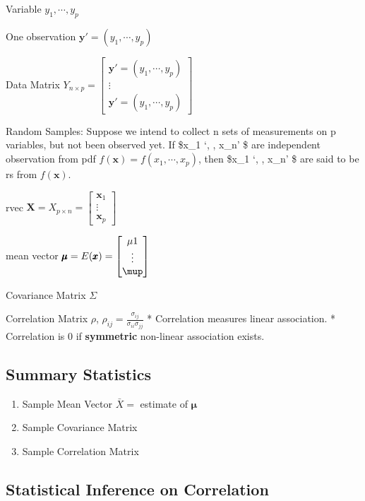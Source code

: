 \documentclass[
]{book}
\providecommand{\tightlist}{%
  \setlength{\itemsep}{0pt}\setlength{\parskip}{0pt}}
\begin{document}
Variable \(y_1 , \cdots, y_p\)

One observation \(\pmb y ' = (y_1 , \cdots, y_p )\)

Data Matrix \(Y_{n \times p} = \begin{bmatrix} \pmb y ' = (y_1 , \cdots, y_p ) \\ \vdots \\ \pmb y ' = (y_1 , \cdots, y_p ) \end{bmatrix}\)

Random Samples: Suppose we intend to collect n sets of measurements on p variables, but not been observed yet. If \$\pmb x\_1 `, \cdots, \pmb x\_n' \$ are independent observation from pdf \(f(\pmb x) = f(x_1, \cdots, x_p)\), then \$\pmb x\_1 `, \cdots, \pmb x\_n' \$ are said to be rs from \(f(\pmb x)\).

rvec \(\pmb X = X_{p \times n} = \begin{bmatrix} \pmb x_1 \\ \vdots \\ \pmb x_p \end{bmatrix}\)

mean vector \(\pmb \mu = E (\pmb x) = \begin{bmatrix} \mu1 \\ \vdots \\ \mup \end{bmatrix}\)

Covariance Matrix \(\Sigma\)

Correlation Matrix \(\rho\), \(\rho_{ij} = \tfrac{\sigma_{ij}}{\sigma_{ii}\sigma_{jj}}\)
* Correlation measures linear association.
* Correlation is 0 if \textbf{symmetric} non-linear association exists.

\hypertarget{summary-statistics}{%
\subsection{Summary Statistics}\label{summary-statistics}}

\begin{enumerate}
\def\labelenumi{\arabic{enumi}.}
\tightlist
\item
  Sample Mean Vector \(\bar X=\) estimate of \(\pmb \mu\)
\item
  Sample Covariance Matrix
\item
  Sample Correlation Matrix
\end{enumerate}

\hypertarget{statistical-inference-on-correlation}{%
\subsection{Statistical Inference on Correlation}\label{statistical-inference-on-correlation}}
\end{document}
